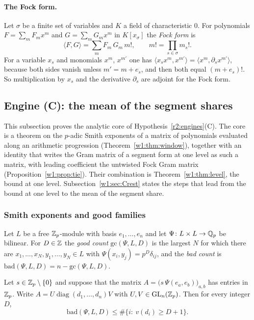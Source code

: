\paragraph{The Fock form.} Let $\sigma$ be a finite set of variables and $K$ a field of characteristic $0$. For polynomials $F=\sum_mF_mx^m$ and $G=\sum_mG_mx^m$ in $K[x_\sigma]$ the \emph{Fock form} is
\begin{equation}\label{w1:eq:fock}
\langle F,G\rangle=\sum_mF_m\,G_m\,m!,\qquad m!=\prod_{s\in\sigma}m_s!.
\end{equation}
For a variable $x_s$ and monomials $x^m$, $x^{m'}$ one has $\langle x_sx^m,x^{m'}\rangle=\langle x^m,\partial_sx^{m'}\rangle$, because both sides vanish unless $m'=m+e_s$, and then both equal $(m+e_s)!$. So multiplication by $x_s$ and the derivative $\partial_s$ are adjoint for the Fock form.

\subsection{Engine (C): the mean of the segment shares}\label{w1:sec:C}

This subsection proves the analytic core of Hypothesis~\ref{r2:engines}(C). The core is a theorem on the $p$-adic Smith exponents of a matrix of polynomials evaluated along an arithmetic progression (Theorem~\ref{w1:thm:window}), together with an identity that writes the Gram matrix of a segment form at one level as such a matrix, with leading coefficient the untwisted Fock Gram matrix (Proposition~\ref{w1:prop:tie}). Their combination is Theorem~\ref{w1:thm:level}, the bound at one level. Subsection~\ref{w1:sec:Crest} states the steps that lead from the bound at one level to the mean of the segment share.

\subsubsection{Smith exponents and good families}

Let $L$ be a free $\mathbb Z_p$-module with basis $e_1,\dots,e_n$ and let $\Psi\colon L\times L\to\mathbb Q_p$ be bilinear. For $D\in\mathbb Z$ the \emph{good count} $\mathrm{gc}(\Psi,L,D)$ is the largest $N$ for which there are $x_1,\dots,x_N,y_1,\dots,y_N\in L$ with $\Psi(x_i,y_j)=p^D\delta_{ij}$, and the \emph{bad count} is $\mathrm{bad}(\Psi,L,D)=n-\mathrm{gc}(\Psi,L,D)$.

\begin{lemma}\label{w1:lem:smithbad}
Let $s\in\mathbb Z_p\setminus\{0\}$ and suppose that the matrix $A=\big(s\,\Psi(e_a,e_b)\big)_{a,b}$ has entries in $\mathbb Z_p$. Write $A=U\operatorname{diag}(d_1,\dots,d_n)V$ with $U,V\in\mathrm{GL}_n(\mathbb Z_p)$. Then for every integer $D$,
\[
\mathrm{bad}(\Psi,L,D)\le\#\{i:\ v(d_i)\ge D+1\}.
\]
\end{lemma}

